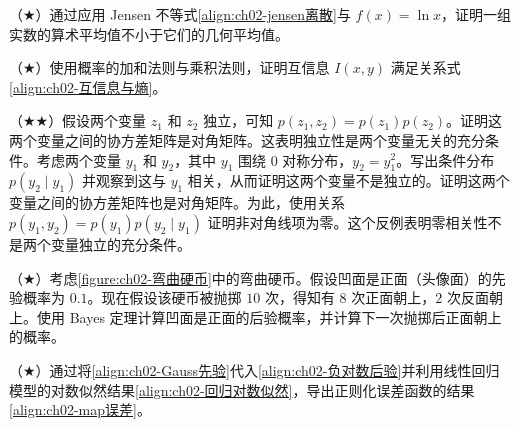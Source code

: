 \documentclass[../../main.tex]{subfiles}
\begin{document}
\begin{exercise}\label{exercise:ch02-37}
（$\bigstar$）通过应用 Jensen 不等式\eqref{align:ch02-jensen离散}与 $f(x)=\ln x$，证明一组实数的算术平均值不小于它们的几何平均值。
\end{exercise}

\begin{exercise}\label{exercise:ch02-38}
（$\bigstar$）使用概率的加和法则与乘积法则，证明互信息 $I(x,y)$ 满足关系式\eqref{align:ch02-互信息与熵}。
\end{exercise}

\begin{exercise}\label{exercise:ch02-39}
（$\bigstar\bigstar$）假设两个变量 $z_1$ 和 $z_2$ 独立，可知 $p(z_1,z_2)=p(z_1)p(z_2)$。证明这两个变量之间的协方差矩阵是对角矩阵。这表明独立性是两个变量无关的充分条件。考虑两个变量 $y_1$ 和 $y_2$，其中 $y_1$ 围绕 $0$ 对称分布，$y_2=y_1^{2}$。写出条件分布 $p(y_2\mid y_1)$ 并观察到这与 $y_1$ 相关，从而证明这两个变量不是独立的。证明这两个变量之间的协方差矩阵也是对角矩阵。为此，使用关系 $p(y_1,y_2)=p(y_1)p(y_2\mid y_1)$ 证明非对角线项为零。这个反例表明零相关性不是两个变量独立的充分条件。
\end{exercise}

\begin{exercise}\label{exercise:ch02-40}
（$\bigstar$）考虑\cref{figure:ch02-弯曲硬币}中的弯曲硬币。假设凹面是正面（头像面）的先验概率为 $0.1$。现在假设该硬币被抛掷 $10$ 次，得知有 $8$ 次正面朝上，$2$ 次反面朝上。使用 Bayes 定理计算凹面是正面的后验概率，并计算下一次抛掷后正面朝上的概率。
\end{exercise}

\begin{exercise}\label{exercise:ch02-41}
（$\bigstar$）通过将\eqref{align:ch02-Gauss先验}代入\eqref{align:ch02-负对数后验}并利用线性回归模型的对数似然结果\eqref{align:ch02-回归对数似然}，导出正则化误差函数的结果\eqref{align:ch02-map误差}。
\end{exercise}
\end{document}

